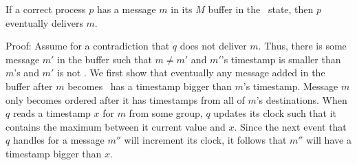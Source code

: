 %
%

\begin{lemma}
If a correct process $p$ has a message $m$ in its $M$ buffer in the \ordered\ state, then $p$ eventually delivers $m$.
\label{lemma:Z}
\end{lemma}
\noindent
{\sc Proof:} 
Assume for a contradiction that $q$ does not deliver $m$.
Thus, there is some message $m'$ in the buffer such that $m \neq m'$ and $m'$'s timestamp is smaller than $m$'s and $m'$ is not \ordered.
We first show that eventually any message added in the buffer after $m$ becomes \ordered\ has a timestamp bigger than $m$'s timestamp.
Message $m$ only becomes ordered after it has timestamps from all of $m$'s destinations.
When $q$ reads a timestamp $x$ for $m$ from some group, $q$ updates its clock such that it contains the maximum between it current value and $x$.
Since the next event that $q$ handles for a message $m''$ will increment its clock, it follows that $m''$ will have a timestamp bigger than $x$.


